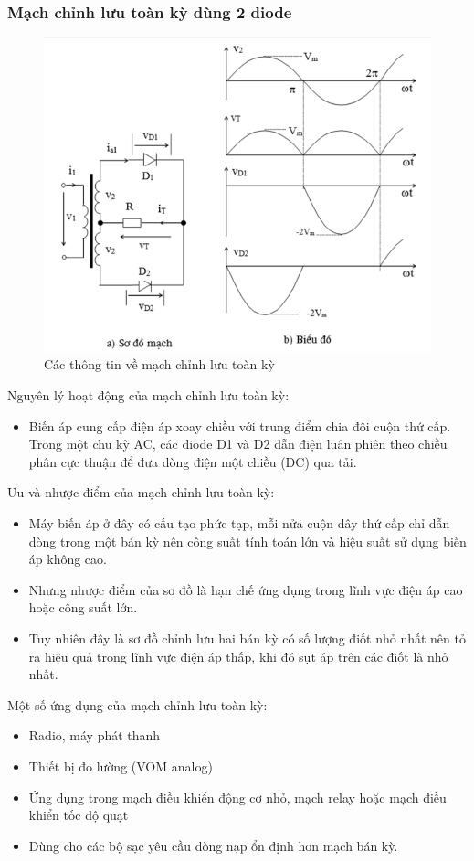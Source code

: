 \documentclass[a4paper,15pt]{article}
\begin{document}
\subsubsection{Mạch chỉnh lưu toàn kỳ dùng 2 diode}
\begin{figure}[H]
    \centering
    \includegraphics[scale=0.5]{img/sodomachtoanky.PNG}
    \caption{Các thông tin về mạch chỉnh lưu toàn kỳ}
    \label{fig:enter-label}
\end{figure}
Nguyên lý hoạt động của mạch chỉnh lưu toàn kỳ: 
\begin{itemize}
    \item Biến áp cung cấp điện áp xoay chiều với trung điểm chia đôi cuộn thứ cấp. Trong một chu kỳ AC, các diode D1 và D2 dẫn điện luân phiên theo chiều phân cực thuận để đưa dòng điện một chiều (DC) qua tải.
    
\end{itemize}
Ưu và nhược điểm của mạch chỉnh lưu toàn kỳ:
\begin{itemize}
    \item Máy biến áp ở đây có cấu tạo phức tạp, mỗi nửa cuộn dây thứ cấp chỉ dẫn dòng trong một bán kỳ nên công suất tính toán lớn và hiệu suất sử dụng biến áp không cao.
    \item Nhưng nhược điểm của sơ đồ là hạn chế ứng dụng trong lĩnh vực điện áp cao hoặc công suất lớn.
    \item Tuy nhiên đây là sơ đồ chỉnh lưu hai bán kỳ có số lượng điốt nhỏ nhất nên tỏ ra hiệu quả trong lĩnh vực điện áp thấp, khi đó sụt áp trên các điốt là nhỏ nhất.
\end{itemize}
Một số ứng dụng của mạch chỉnh lưu toàn kỳ:
\begin{itemize}
    \item Radio, máy phát thanh
    \item Thiết bị đo lường (VOM analog)
    \item Ứng dụng trong mạch điều khiển động cơ nhỏ, mạch relay hoặc mạch điều khiển tốc độ quạt
    \item Dùng cho các bộ sạc yêu cầu dòng nạp ổn định hơn mạch bán kỳ.
\end{itemize}
\newpage 
\end{document}
